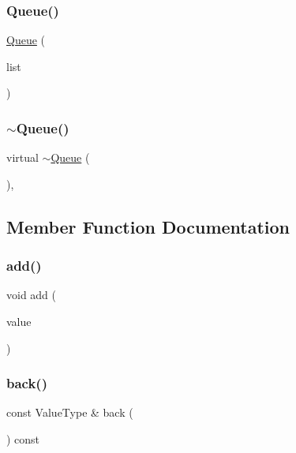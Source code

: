 \subsubsection{\texorpdfstring{Queue()}{Queue()}\hspace{0.1cm}{\footnotesize\ttfamily [2/2]}}
{\footnotesize\ttfamily \mbox{\hyperlink{classQueue}{Queue}} (\begin{DoxyParamCaption}\item[{std\+::initializer\+\_\+list$<$ Value\+Type $>$}]{list }\end{DoxyParamCaption})}

\mbox{\label{classQueue_ae83407b742657a6444a1ce04f5ad6606}} 
\subsubsection{\texorpdfstring{$\sim$\+Queue()}{~Queue()}}
{\footnotesize\ttfamily virtual $\sim$\mbox{\hyperlink{classQueue}{Queue}} (\begin{DoxyParamCaption}{ }\end{DoxyParamCaption})\hspace{0.3cm}{\ttfamily [virtual]}, {\ttfamily [default]}}



\subsection{Member Function Documentation}
\mbox{\label{classQueue_ab901606bf3a8019c986f0cf9a9f298dc}} 
\subsubsection{\texorpdfstring{add()}{add()}}
{\footnotesize\ttfamily void add (\begin{DoxyParamCaption}\item[{const Value\+Type \&}]{value }\end{DoxyParamCaption})}

\mbox{\label{classQueue_adc761c91bdacd01bed5c96e25fd9486a}} 
\subsubsection{\texorpdfstring{back()}{back()}}
{\footnotesize\ttfamily const Value\+Type \& back (\begin{DoxyParamCaption}{ }\end{DoxyParamCaption}) const}

